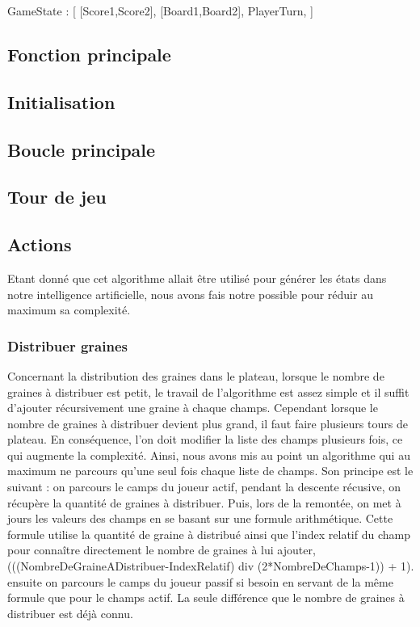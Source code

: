 \documentclass[]{article}
\begin{document}
GameState :
[
	[Score1,Score2],
	[Board1,Board2],
	PlayerTurn, 
]

\subsection{Fonction principale}



\subsection{Initialisation}

\subsection{Boucle principale}

\subsection{Tour de jeu}



\subsection{Actions}

Etant donné que cet algorithme allait être utilisé pour générer les états dans notre intelligence artificielle, nous avons fais notre possible pour réduir au maximum sa complexité.

\subsubsection{Distribuer graines}

	Concernant la distribution des graines dans le plateau, lorsque le nombre de graines à distribuer est petit, le travail de l'algorithme est assez simple et il suffit d'ajouter récursivement une graine à chaque champs.
Cependant lorsque le nombre de graines à distribuer devient plus grand, il faut faire plusieurs tours de plateau. En conséquence, l'on doit modifier la liste des champs plusieurs fois, ce qui augmente la complexité.
Ainsi, nous avons mis au point un algorithme qui au maximum ne parcours qu'une seul fois chaque liste de champs.
Son principe est le suivant :
	on parcours le camps du joueur actif, pendant la descente récusive, on récupère la quantité de graines à distribuer. Puis, lors de la remontée, on met à jours les valeurs des champs en se basant sur une formule arithmétique. Cette formule utilise la quantité de graine à distribué ainsi que l'index relatif du champ pour connaître directement le nombre de graines à lui ajouter, (((NombreDeGraineADistribuer-IndexRelatif) div (2*NombreDeChamps-1)) + 1).
	ensuite on parcours le camps du joueur passif si besoin en servant de la même formule que pour le champs actif. La seule différence que le nombre de graines à distribuer est déjà connu.
\end{document}

